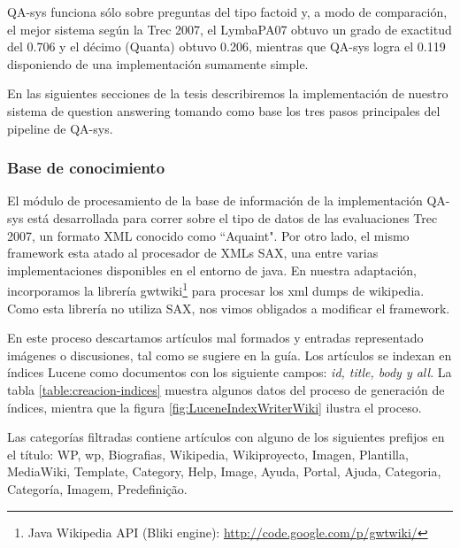 QA-sys funciona sólo sobre preguntas del tipo
factoid y, a modo de comparación, el mejor sistema según la Trec
2007, el LymbaPA07 obtuvo un grado de exactitud del 0.706 y el décimo
(Quanta) obtuvo 0.206, mientras que QA-sys logra el 0.119 disponiendo de una implementación sumamente simple.

En las siguientes secciones de la tesis describiremos la implementación de nuestro sistema de question answering tomando como base los tres pasos principales del pipeline de QA-sys. 

\subsubsection{Base de conocimiento}

El módulo de procesamiento de la base de información de la implementación QA-sys está desarrollada para correr sobre el tipo de datos de las evaluaciones Trec 2007, un formato XML conocido como ``Aquaint". Por otro lado, el mismo framework esta atado al procesador de XMLs SAX, una entre varias implementaciones disponibles en el entorno de java. En nuestra adaptación, incorporamos la librería gwtwiki\footnote{Java Wikipedia API (Bliki engine): \url{http://code.google.com/p/gwtwiki/}} para procesar los xml dumps de wikipedia. Como esta librería no utiliza SAX, nos vimos obligados a modificar el framework. 

En este proceso descartamos artículos mal formados y entradas representado imágenes o discusiones, tal como se sugiere en la guía. 
Los artículos se indexan en índices Lucene como documentos con los siguiente campos: \emph{id, title, body y all}. 
La tabla \ref{table:creacion-indices} muestra algunos datos del proceso de generación de índices, mientra que la figura \ref{fig:LuceneIndexWriterWiki} ilustra el proceso.

Las categorías filtradas contiene artículos con alguno de los siguientes prefijos en el título: WP, wp, Biografias, Wikipedia, Wikiproyecto, Imagen, Plantilla, MediaWiki, Template, Category, Help, Image, Ayuda, Portal, Ajuda, Categoria, Categoría, Imagem, Predefinição.



